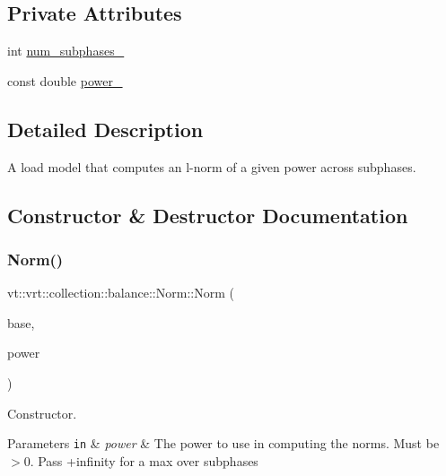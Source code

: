\subsection*{Private Attributes}
\begin{DoxyCompactItemize}
\item 
int \hyperlink{classvt_1_1vrt_1_1collection_1_1balance_1_1_norm_a12fd7aeaa57fbad06243adc6f13e32fc}{num\+\_\+subphases\+\_\+}
\item 
const double \hyperlink{classvt_1_1vrt_1_1collection_1_1balance_1_1_norm_a03090310a3420b16ee581541cb261661}{power\+\_\+}
\end{DoxyCompactItemize}


\subsection{Detailed Description}
A load model that computes an l-\/norm of a given power across subphases. 

\subsection{Constructor \& Destructor Documentation}
\mbox{\label{classvt_1_1vrt_1_1collection_1_1balance_1_1_norm_a054625ebe2a8dcd9f986f36f40b70ada}} 
\subsubsection{\texorpdfstring{Norm()}{Norm()}}
{\footnotesize\ttfamily vt\+::vrt\+::collection\+::balance\+::\+Norm\+::\+Norm (\begin{DoxyParamCaption}\item[{std\+::shared\+\_\+ptr$<$ \hyperlink{classvt_1_1vrt_1_1collection_1_1balance_1_1_load_model}{balance\+::\+Load\+Model} $>$}]{base,  }\item[{double}]{power }\end{DoxyParamCaption})}



Constructor. 


\begin{DoxyParams}[1]{Parameters}
\mbox{\tt in}  & {\em power} & The power to use in computing the norms. Must be $>$0. Pass +infinity for a {\ttfamily max} over subphases \\
\hline
\end{DoxyParams}



